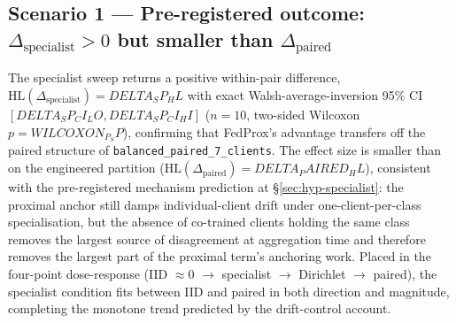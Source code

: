 %
%
%

\subsection*{Scenario 1 — Pre-registered outcome:
$\Delta_{\mathrm{specialist}} > 0$ but smaller than $\Delta_{\mathrm{paired}}$}
The specialist sweep returns a positive within-pair difference,
$\mathrm{HL}(\Delta_{\mathrm{specialist}}) = {DELTA_SP_HL}$ with exact
Walsh-average-inversion 95\% CI $[{DELTA_SP_CI_LO}, {DELTA_SP_CI_HI}]$
($n=10$, two-sided Wilcoxon $p = {WILCOXON_P_SP}$), confirming that
FedProx's advantage transfers off the paired structure of
\texttt{balanced\_paired\_7\_clients}. The effect size is smaller than
on the engineered partition ($\mathrm{HL}(\Delta_{\mathrm{paired}}) =
{DELTA_PAIRED_HL}$), consistent with the pre-registered mechanism
prediction at \S\ref{sec:hyp-specialist}: the proximal anchor still
damps individual-client drift under one-client-per-class specialisation,
but the absence of co-trained clients holding the same class removes
the largest source of disagreement at aggregation time and therefore
removes the largest part of the proximal term's anchoring work. Placed
in the four-point dose-response (IID $\approx 0$ $\to$ specialist
$\to$ Dirichlet $\to$ paired), the specialist condition fits between
IID and paired in both direction and magnitude, completing the monotone
trend predicted by the drift-control account.

